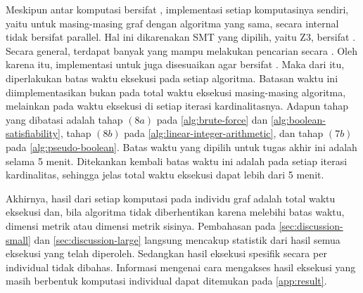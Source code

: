 Meskipun antar komputasi bersifat , implementasi setiap komputasinya sendiri, yaitu untuk masing-masing graf dengan algoritma yang sama, secara internal tidak bersifat parallel. Hal ini dikarenakan  SMT yang dipilih, yaitu Z3, bersifat . Secara general, terdapat banyak  yang mampu melakukan pencarian  secara . Oleh karena itu, implementasi untuk  juga disesuaikan agar bersifat . Maka dari itu, diperlakukan batas waktu eksekusi pada setiap algoritma. Batasan waktu ini diimplementasikan bukan pada total waktu eksekusi masing-masing algoritma, melainkan pada waktu eksekusi di setiap iterasi kardinalitasnya. Adapun tahap yang dibatasi adalah tahap \((8a)\) pada \autoref{alg:brute-force} dan \autoref{alg:boolean-satisfiability}, tahap \((8b)\) pada \autoref{alg:linear-integer-arithmetic}, dan tahap \((7b)\) pada \autoref{alg:pseudo-boolean}. Batas waktu yang dipilih untuk tugas akhir ini adalah selama 5 menit. Ditekankan kembali batas waktu ini adalah pada setiap iterasi kardinalitas, sehingga jelas total waktu eksekusi dapat lebih dari 5 menit.

Akhirnya, hasil dari setiap komputasi pada individu graf adalah total waktu eksekusi dan, bila algoritma tidak diberhentikan karena melebihi batas waktu, dimensi metrik atau dimensi metrik sisinya. Pembahasan pada \autoref{sec:discussion-small} dan \autoref{sec:discussion-large} langsung mencakup statistik dari hasil semua eksekusi yang telah diperoleh. Sedangkan hasil eksekusi spesifik secara per individual tidak dibahas. Informasi mengenai cara mengakses hasil eksekusi yang masih berbentuk komputasi individual dapat ditemukan pada \cref{app:result}.
